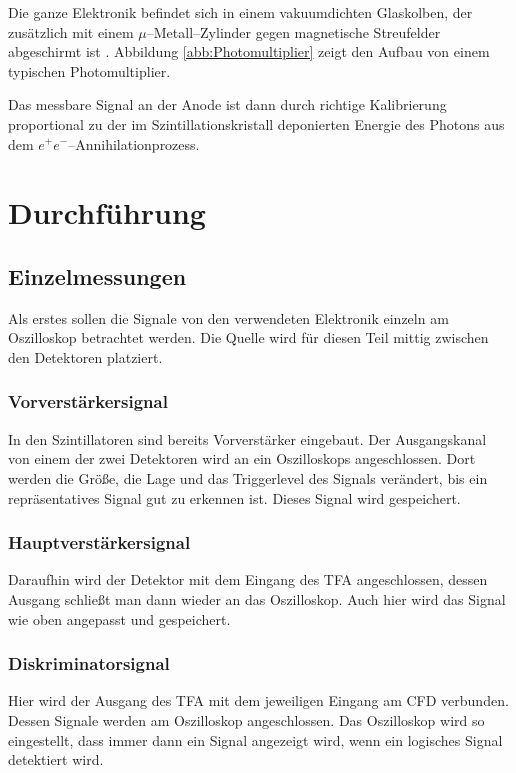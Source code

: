 \documentclass[12pt,a4paper]{scrartcl}
\numberwithin{equation}{section} %
\begin{document}
Die ganze Elektronik befindet sich in einem vakuumdichten Glaskolben, der zusätzlich mit einem $\mu$--Metall--Zylinder gegen magnetische Streufelder abgeschirmt ist \cite{LMU}. Abbildung \ref{abb:Photomultiplier} zeigt den Aufbau von einem typischen Photomultiplier.

Das messbare Signal an der Anode ist dann durch richtige Kalibrierung proportional zu der im Szintillationskristall deponierten Energie des Photons aus dem $e^+ e^-$--Annihilationprozess.

\clearpage
\hypertarget{durchfuxfchrung}{%
\section{Durchführung}\label{durchfuxfchrung}}

\subsection{Einzelmessungen}
Als erstes sollen die Signale von den verwendeten Elektronik einzeln am Oszilloskop betrachtet werden. Die Quelle wird für diesen Teil mittig zwischen den Detektoren platziert.

\subsubsection{Vorverstärkersignal}
In den Szintillatoren sind bereits Vorverstärker eingebaut. Der Ausgangskanal von einem der zwei Detektoren wird an ein Oszilloskops angeschlossen. Dort werden die Größe, die Lage und das Triggerlevel des Signals verändert, bis ein repräsentatives Signal gut zu erkennen ist. Dieses Signal wird gespeichert.

\subsubsection{Hauptverstärkersignal}
Daraufhin wird der Detektor mit dem Eingang des TFA angeschlossen, dessen Ausgang schließt man dann wieder an das Oszilloskop. Auch hier wird das Signal wie oben angepasst und gespeichert.

\subsubsection{Diskriminatorsignal}
Hier wird der Ausgang des TFA mit dem jeweiligen Eingang am CFD verbunden. Dessen Signale werden am Oszilloskop angeschlossen. Das Oszilloskop wird so eingestellt, dass immer dann ein Signal angezeigt wird, wenn ein logisches Signal detektiert wird.
\end{document}
